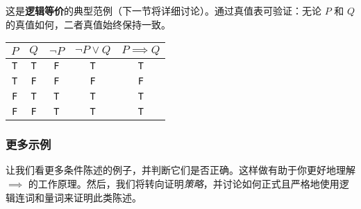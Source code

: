 这是\textbf{逻辑等价}的典型范例（下一节将详细讨论）。通过真值表可验证：无论 $P$ 和 $Q$ 的真值如何，二者真值始终保持一致。

\begin{center}
    \begin{tabular}{c|c|c|c|c}
          $P$      & $Q$      & $\neg P$ & $\neg P \lor Q$ & $P \implies Q$ \\
          \hline
          \verb|T| & \verb|T| & \verb|F| &     \verb|T|    &  \verb|T|   \\
          \verb|T| & \verb|F| & \verb|F| &     \verb|F|    &  \verb|F|   \\
          \verb|F| & \verb|T| & \verb|T| &     \verb|T|    &  \verb|T|   \\
          \verb|F| & \verb|F| & \verb|T| &     \verb|T|    &  \verb|T|   \\
    \end{tabular}
\end{center}

\subsubsection*{更多示例}

让我们看更多条件陈述的例子，并判断它们是否正确。这样做有助于你更好地理解 $\implies$ 的工作原理。然后，我们将转向证明\emph{策略}，并讨论如何正式且严格地使用逻辑连词和量词来证明此类陈述。

